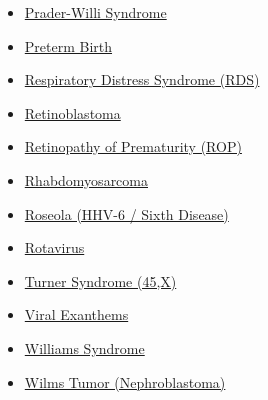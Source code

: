 \begin{itemize}[noitemsep]
  \item \hyperlink{sec:Prader-Willi Syndrome}{Prader-Willi Syndrome}
  \item \hyperlink{sec:Preterm Birth}{Preterm Birth}
  \item \hyperlink{sec:Respiratory Distress Syndrome}{Respiratory Distress Syndrome (RDS)}
  \item \hyperlink{sec:Retinoblastoma}{Retinoblastoma}
  \item \hyperlink{sec:pediatric:Retinopathy of Prematurity}{Retinopathy of Prematurity (ROP)}
  \item \hyperlink{sec:Rhabdomyosarcoma}{Rhabdomyosarcoma}
  \item \hyperlink{sec:Roseola (HHV-6 / Sixth Disease)}{Roseola (HHV-6 / Sixth Disease)}
  \item \hyperlink{sec:Rotavirus}{Rotavirus}
  \item \hyperlink{sec:Turner Syndrome}{Turner Syndrome (45,X)}
  \item \hyperlink{sec:Viral Exanthems}{Viral Exanthems}
  \item \hyperlink{sec:Williams Syndrome}{Williams Syndrome}
  \item \hyperlink{sec:Wilms Tumor}{Wilms Tumor (Nephroblastoma)}
\end{itemize}

